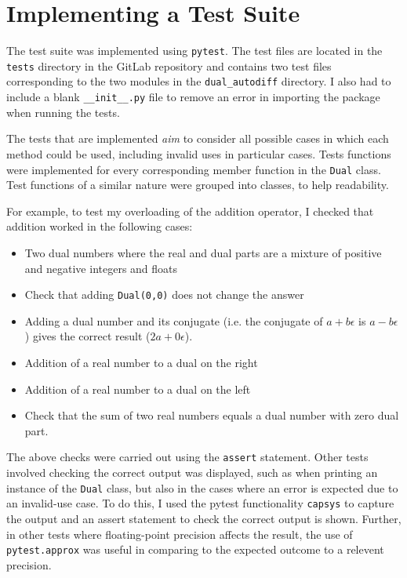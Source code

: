 \documentclass{article}
\begin{document}
\section{Implementing a Test Suite} \label{tests}
The test suite was implemented using \texttt{pytest}. The test files are located in the \texttt{tests} directory in the GitLab repository and contains two test files corresponding to the two modules in the \texttt{dual\_autodiff} directory. I also had to include a blank \texttt{\_\_init\_\_.py} file to remove an error in importing the package when running the tests.

The tests that are implemented \textit{aim} to consider all possible cases in which each method could be used, including invalid uses in particular cases. Tests functions were implemented for every corresponding member function in the \texttt{Dual} class. Test functions of a similar nature were grouped into classes, to help readability. 

For example, to test my overloading of the addition operator, I checked that addition worked in the following cases:
\begin{itemize}
    \item Two dual numbers where the real and dual parts are a mixture of positive and negative integers and floats
    \item Check that adding \texttt{Dual(0,0)} does not change the answer
    \item Adding a dual number and its conjugate (i.e. the conjugate of $a+b\epsilon$ is $a-b\epsilon$) gives the correct result  ($2a+0\epsilon$).
    \item Addition of a real number to a dual on the right
    \item Addition of a real number to a dual on the left
    \item Check that the sum of two real numbers equals a dual number with zero dual part.
\end{itemize}

The above checks were carried out using the \texttt{assert} statement. Other tests involved checking the correct output was displayed, such as when printing an instance of the \texttt{Dual} class, but also in the cases where an error is expected due to an invalid-use case. To do this, I used the pytest functionality \texttt{capsys} to capture the output and an assert statement to check the correct output is shown. Further, in other tests where floating-point precision affects the result, the use of \texttt{pytest.approx} was useful in comparing to the expected outcome to a relevent precision. 
\end{document}
